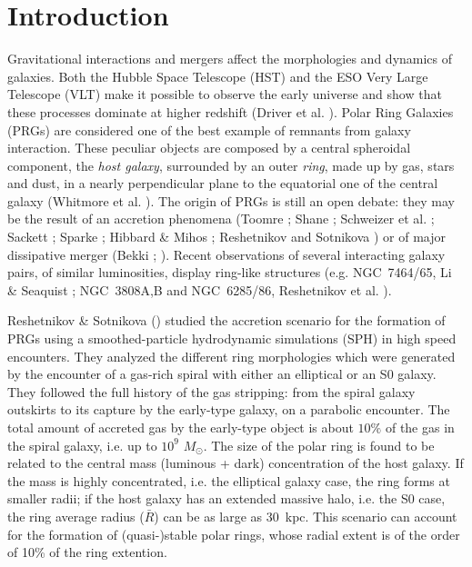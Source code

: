 \documentclass{aa}
\begin{document}
\section{Introduction}\label{intro}
Gravitational interactions and mergers affect the morphologies and
dynamics of galaxies. Both the Hubble Space Telescope (HST) and
the ESO Very Large Telescope (VLT) make it possible to observe the early
universe and show that these processes dominate at higher redshift
(Driver et al. \cite{driver95}).
Polar Ring Galaxies (PRGs) are considered one of the best example of
remnants from galaxy interaction. These peculiar objects are composed by a
central spheroidal component, the {\it host galaxy}, surrounded by an
outer {\it ring}, made up by gas, stars and dust, in a
nearly perpendicular plane to the equatorial one of the central galaxy
(Whitmore et al. \cite{PRC}).
The origin of PRGs is still an open debate: they may be the result of
an accretion phenomena (Toomre \cite{Toomre77}; Shane \cite{Shane80}; 
Schweizer et al. \cite{Schweizer83}; Sackett \cite{Sackett91}; Sparke
\cite{Sparke91}; Hibbard \& Mihos \cite{Hibbard95}; Reshetnikov and
Sotnikova \cite{Resh_Sot97})
or of major dissipative merger (Bekki \cite{Bekki97}; \cite{Bekki98}).
Recent observations of several interacting galaxy pairs, of similar
luminosities, display ring-like structures (e.g. NGC~7464/65,
Li \& Seaquist \cite{Li94}; NGC~3808A,B and NGC~6285/86, Reshetnikov et al. 
\cite{Resh96}).

Reshetnikov \& Sotnikova (\cite{Resh_Sot97}) studied 
the accretion scenario for the formation of PRGs using 
a smoothed-particle hydrodynamic simulations (SPH) in high speed
encounters. They analyzed the different ring morphologies
which were generated by the encounter of a gas-rich spiral with either an
elliptical or an S0 galaxy.
They followed the full history of the gas stripping: from the 
spiral galaxy outskirts to its capture by the early-type galaxy,
on a parabolic encounter. The total amount of accreted gas 
by the early-type object is about $10\%$ of the gas in the spiral
galaxy, i.e. up to $10^{9}$ $M_{\odot}$.
The size of the polar ring is found to be related to the central mass 
(luminous + dark) concentration of the host galaxy.  If the mass is highly
concentrated, i.e. the elliptical galaxy case, the ring forms at smaller
radii; if the host galaxy has an extended massive halo, i.e. the S0 case,
the ring average radius ($\bar{R}$) can be as large as 30~kpc.
This scenario can account for the formation of (quasi-)stable polar rings, 
whose radial extent is of the order of 10\% of the ring extention.
\end{document}
